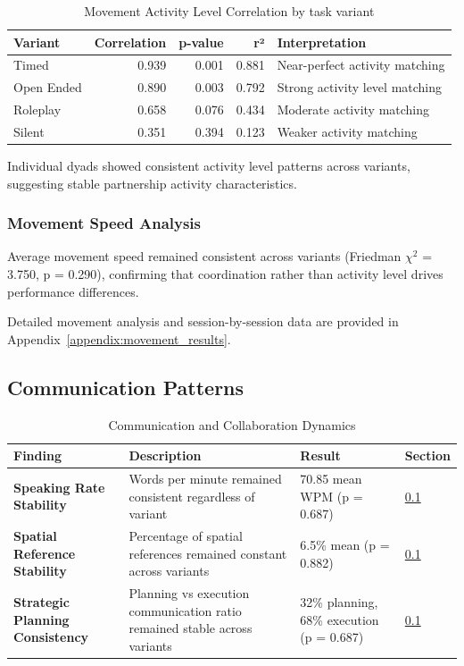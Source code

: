 \begin{table}[htbp]
\centering
\caption{Movement Activity Level Correlation by task variant}
\label{tab:movement_sync}
\begin{tabular}{lrrrl}
\toprule
\textbf{Variant} & \textbf{Correlation} & \textbf{p-value} & \textbf{r²} & \textbf{Interpretation} \\
\midrule
Timed & 0.939 & 0.001 & 0.881 & Near-perfect activity matching \\
Open Ended & 0.890 & 0.003 & 0.792 & Strong activity level matching \\
Roleplay & 0.658 & 0.076 & 0.434 & Moderate activity matching \\
Silent & 0.351 & 0.394 & 0.123 & Weaker activity matching \\
\bottomrule
\end{tabular}
\end{table}

Individual dyads showed consistent activity level patterns across variants, suggesting stable partnership activity characteristics.

\subsubsection{Movement Speed Analysis}

Average movement speed remained consistent across variants (Friedman $\chi^2$ = 3.750, p = 0.290), confirming that coordination rather than activity level drives performance differences.

Detailed movement analysis and session-by-session data are provided in Appendix~\ref{appendix:movement_results}.

\subsection{Communication Patterns}\label{sec:communication}

\begin{table}[!t]
\centering
\caption{Communication and Collaboration Dynamics}
\label{tab:communication_summary}
\begin{tabular}{@{}p{3.2cm}p{5.5cm}p{3.2cm}p{2.3cm}@{}}
\toprule
\textbf{Finding} & \textbf{Description} & \textbf{Result} & \textbf{Section} \\
\midrule
\textbf{Speaking Rate Stability} & Words per minute remained consistent regardless of variant & 70.85 mean WPM (p = 0.687) & \ref{sec:communication} \\
\textbf{Spatial Reference Stability} & Percentage of spatial references remained constant across variants & 6.5\% mean (p = 0.882) & \ref{sec:communication} \\
\textbf{Strategic Planning Consistency} & Planning vs execution communication ratio remained stable across variants & 32\% planning, 68\% execution (p = 0.687) & \ref{sec:communication} \\
\bottomrule
\end{tabular}
\end{table}

